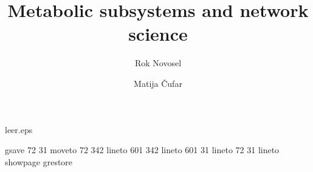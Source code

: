\begin{filecontents}{leer.eps}

gsave
72 31 moveto
72 342 lineto
601 342 lineto
601 31 lineto
72 31 lineto
showpage
grestore
\end{filecontents}
%
\documentclass[epj]{svjour}
%
\usepackage{graphicx}
%

%
\title{Metabolic subsystems and network science}
\author{Rok Novosel \and Matija \v{C}ufar
}                     %
%
%
%


\maketitle

\section{Introduction}
\label{sec:intro}

Since the beginning the turn of the century, life sciences have been evolving
rapidly. Advances in data acquisition, storage and analysis technology have
allowed scientist to gather immense amounts of data and build complex models
from it\cite{modsys}. These complicated models have brought people of various
backgrounds, such as physics, mathemathics and computer science into the field
of biology.

